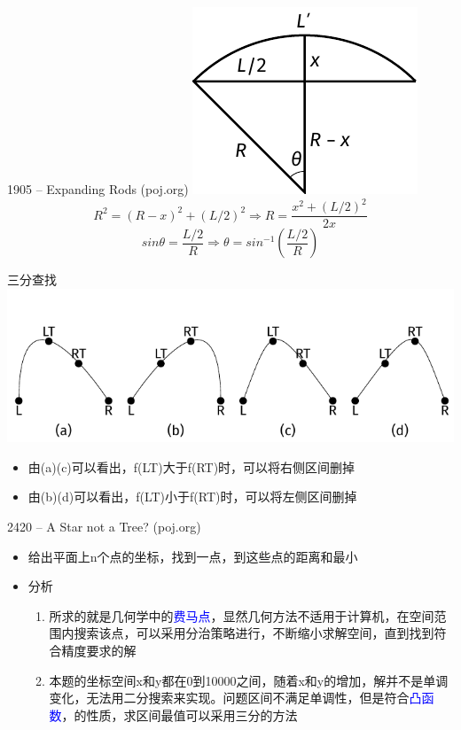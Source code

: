 \begin{frame}{1905 -- Expanding Rods (poj.org)}
    \includegraphics[center]{fig/2-5.pdf}
    $$R^2=(R-x)^2+(L/2)^2\Rightarrow R=\frac{x^2+(L/2)^2}{2x}$$
	$$sinθ=\frac{L/2}{R}\Rightarrow θ=sin^{-1}(\frac{L/2}{R})$$
\end{frame}
\begin{frame}{三分查找}
    \includegraphics[scale=.8]{fig/2-6.pdf}
    \begin{itemize}
        \item 由(a)(c)可以看出，f(LT)大于f(RT)时，可以将右侧区间删掉
        \item 由(b)(d)可以看出，f(LT)小于f(RT)时，可以将左侧区间删掉
    \end{itemize}
\end{frame}
\begin{frame}{2420 -- A Star not a Tree? (poj.org)}
    \begin{itemize}
        \item 给出平面上n个点的坐标，找到一点，到这些点的距离和最小
    \end{itemize}
    \vfill
    \begin{itemize}
        \item 分析
        \begin{enumerate}
            \item 所求的就是几何学中的\textcolor{blue}{费马点}，显然几何方法不适用于计算机，在空间范围内搜索该点，可以采用分治策略进行，不断缩小求解空间，直到找到符合精度要求的解
            \item 本题的坐标空间x和y都在0到10000之间，随着x和y的增加，解并不是单调变化，无法用二分搜索来实现。问题区间不满足单调性，但是符合\textcolor{blue}{凸函数}，的性质，求区间最值可以采用三分的方法
        \end{enumerate}
    \end{itemize}
\end{frame}
